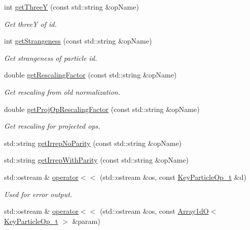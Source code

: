 \begin{DoxyCompactItemize}
int \mbox{\hyperlink{namespaceHadron_a8739169b4caffa5f8bab802592b3302a}{get\+ThreeY}} (const std\+::string \&op\+Name)
\begin{DoxyCompactList}\small\item\em Get threeY of id. \end{DoxyCompactList}\item 
int \mbox{\hyperlink{namespaceHadron_adfdd6762b0b73d56c308a674d4c0164d}{get\+Strangeness}} (const std\+::string \&op\+Name)
\begin{DoxyCompactList}\small\item\em Get strangeness of particle id. \end{DoxyCompactList}\item 
double \mbox{\hyperlink{namespaceHadron_abc76a2d893a589ba2a1a346954901854}{get\+Rescaling\+Factor}} (const std\+::string \&op\+Name)
\begin{DoxyCompactList}\small\item\em Get rescaling from old normalization. \end{DoxyCompactList}\item 
double \mbox{\hyperlink{namespaceHadron_aeb564a291631b101c405d7f4257391f8}{get\+Proj\+Op\+Rescaling\+Factor}} (const std\+::string \&op\+Name)
\begin{DoxyCompactList}\small\item\em Get rescaling for projected ops. \end{DoxyCompactList}\item 
std\+::string \mbox{\hyperlink{namespaceHadron_ae2543483bce4c1e4b6c9ca56d01fe9ac}{get\+Irrep\+No\+Parity}} (const std\+::string \&op\+Name)
\item 
std\+::string \mbox{\hyperlink{namespaceHadron_a0f40c5d7e590d17294e0a27e231c0a4b}{get\+Irrep\+With\+Parity}} (const std\+::string \&op\+Name)
\item 
std\+::ostream \& \mbox{\hyperlink{namespaceHadron_a1a1ad3c7b1e45f6635516f9f1fcd2684}{operator$<$$<$}} (std\+::ostream \&os, const \mbox{\hyperlink{structHadron_1_1KeyParticleOp__t}{Key\+Particle\+Op\+\_\+t}} \&d)
\begin{DoxyCompactList}\small\item\em Used for error output. \end{DoxyCompactList}\item 
std\+::ostream \& \mbox{\hyperlink{namespaceHadron_a815bc759a8acf71f5194f582a963f3f7}{operator$<$$<$}} (std\+::ostream \&os, const \mbox{\hyperlink{classADAT_1_1Array1dO}{Array1dO}}$<$ \mbox{\hyperlink{structHadron_1_1KeyParticleOp__t}{Key\+Particle\+Op\+\_\+t}} $>$ \&param)

\end{DoxyCompactItemize}
